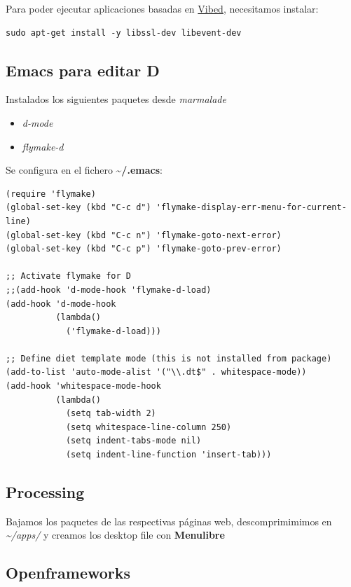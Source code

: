 \documentclass[12pt,spanish,]{article}
\providecommand{\tightlist}{%
  \setlength{\itemsep}{0pt}\setlength{\parskip}{0pt}}
\begin{document}
Para poder ejecutar aplicaciones basadas en
\href{http://vibed.org/}{Vibed}, necesitamos instalar:

\begin{verbatim}
sudo apt-get install -y libssl-dev libevent-dev
\end{verbatim}

\subsection{Emacs para editar D}\label{emacs-para-editar-d}

Instalados los siguientes paquetes desde \emph{marmalade}

\begin{itemize}
\tightlist
\item
  \emph{d-mode}
\item
  \emph{flymake-d}
\end{itemize}

Se configura en el fichero \textbf{\textasciitilde{}/.emacs}:

\begin{verbatim}
(require 'flymake)
(global-set-key (kbd "C-c d") 'flymake-display-err-menu-for-current-line)
(global-set-key (kbd "C-c n") 'flymake-goto-next-error)
(global-set-key (kbd "C-c p") 'flymake-goto-prev-error)

;; Activate flymake for D
;;(add-hook 'd-mode-hook 'flymake-d-load)
(add-hook 'd-mode-hook
          (lambda()
            ('flymake-d-load)))

;; Define diet template mode (this is not installed from package)
(add-to-list 'auto-mode-alist '("\\.dt$" . whitespace-mode))
(add-hook 'whitespace-mode-hook
          (lambda()
            (setq tab-width 2)
            (setq whitespace-line-column 250)
            (setq indent-tabs-mode nil)
            (setq indent-line-function 'insert-tab)))
\end{verbatim}

\subsection{Processing}\label{processing}

Bajamos los paquetes de las respectivas páginas web, descomprimimimos en
\emph{\textasciitilde{}/apps/} y creamos los desktop file con
\textbf{Menulibre}

\subsection{Openframeworks}\label{openframeworks}
\end{document}
